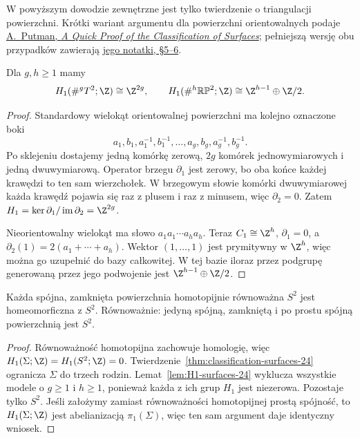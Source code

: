 W powyższym dowodzie zewnętrzne jest tylko
twierdzenie o triangulacji powierzchni.
Krótki wariant argumentu dla powierzchni
orientowalnych podaje
\href{https://academicweb.nd.edu/~andyp/notes/ClassificationSurfaces.pdf}
{A.\ Putman, \emph{A Quick Proof of the Classification of Surfaces}};
pełniejszą wersję obu przypadków zawierają
\href{https://academicweb.nd.edu/~andyp/notes/ClassificationSurfacesLong.pdf}
{jego notatki, §5--6}.

\begin{lemat}
\label{lem:H1-surfaces-24}
Dla $g,h\geq1$ mamy
\[
 H_1(\#^g T^2;\Z)\cong\Z^{2g},
 \qquad
 H_1(\#^h\mathbb{RP}^2;\Z)
     \cong\Z^{h-1}\oplus\Z/2.
\]
\end{lemat}
\begin{proof}
Standardowy wielokąt orientowalnej
powierzchni ma kolejno oznaczone boki
\[
a_1,b_1,a_1^{-1},b_1^{-1},\ldots,
a_g,b_g,a_g^{-1},b_g^{-1}.
\]
Po sklejeniu dostajemy jedną komórkę
zerową, $2g$ komórek jednowymiarowych
i jedną dwuwymiarową. Operator brzegu
$\partial_1$ jest zerowy, bo oba końce
każdej krawędzi to ten sam wierzchołek.
W brzegowym słowie komórki dwuwymiarowej
każda krawędź pojawia się raz z plusem
i raz z minusem, więc $\partial_2=0$.
Zatem $H_1=\ker\partial_1/
\operatorname{im}\partial_2=\Z^{2g}$.

Nieorientowalny wielokąt ma słowo
$a_1a_1\cdots a_ha_h$. Teraz
$C_1\cong\Z^h$, $\partial_1=0$,
a $\partial_2(1)=2(a_1+\cdots+a_h)$.
Wektor $(1,\ldots,1)$ jest prymitywny
w $\Z^h$, więc można go uzupełnić do
bazy całkowitej. W tej bazie iloraz
przez podgrupę generowaną przez jego
podwojenie jest
$\Z^{h-1}\oplus\Z/2$.
\end{proof}

\begin{twierdzenie}
\label{thm:poincare-2-24}
Każda spójna, zamknięta powierzchnia
homotopijnie równoważna $S^2$
jest homeomorficzna z $S^2$.
Równoważnie: jedyną spójną, zamkniętą
i po prostu spójną powierzchnią
jest $S^2$.
\end{twierdzenie}
\begin{proof}
Równoważność homotopijna zachowuje
homologię, więc $H_1(\Sigma;\Z)=
H_1(S^2;\Z)=0$.
Twierdzenie~\ref{thm:classification-surfaces-24}
ogranicza $\Sigma$ do trzech rodzin.
Lemat~\ref{lem:H1-surfaces-24}
wyklucza wszystkie modele o $g\geq1$
i $h\geq1$, ponieważ każda z ich
grup $H_1$ jest niezerowa.
Pozostaje tylko $S^2$.
Jeśli założymy zamiast równoważności
homotopijnej prostą spójność, to
$H_1(\Sigma;\Z)$ jest abelianizacją
$\pi_1(\Sigma)$, więc ten sam argument
daje identyczny wniosek.
\end{proof}

